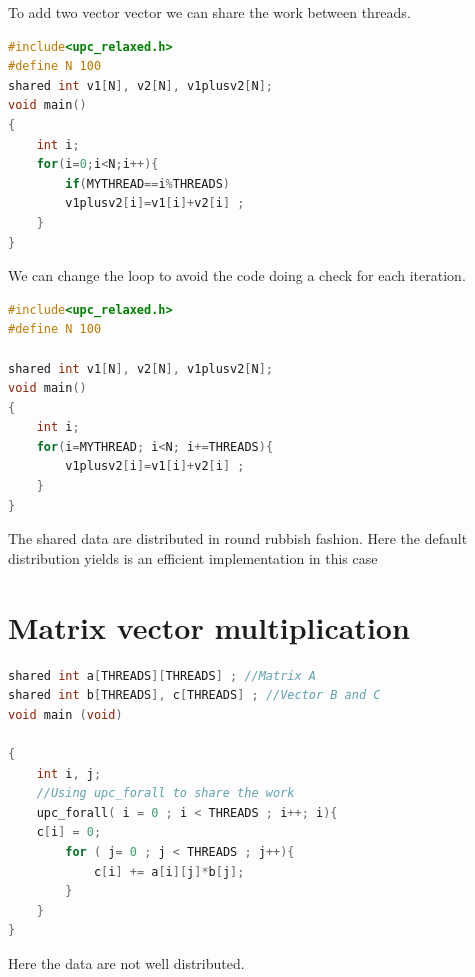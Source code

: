 \documentclass{report}
\begin{document}
To add two vector vector we can share the work between threads.

\begin{lstlisting}[language=C]
#include<upc_relaxed.h> 
#define N 100 
shared int v1[N], v2[N], v1plusv2[N]; 
void main() 
{ 
    int i; 
    for(i=0;i<N;i++){
        if(MYTHREAD==i%THREADS) 
        v1plusv2[i]=v1[i]+v2[i] ; 
    }
}
\end{lstlisting}

We can change the loop to avoid the code doing a check for each iteration.

\begin{lstlisting}[language=C]
#include<upc_relaxed.h> 
#define N 100 

shared int v1[N], v2[N], v1plusv2[N]; 
void main() 
{ 
    int i; 
    for(i=MYTHREAD; i<N; i+=THREADS){
        v1plusv2[i]=v1[i]+v2[i] ; 
    }
}
\end{lstlisting}

The shared data are distributed in round rubbish fashion. Here the default distribution yields is an efficient implementation in this case

\section{Matrix vector multiplication}

\begin{lstlisting}[language=C]
shared int a[THREADS][THREADS] ; //Matrix A
shared int b[THREADS], c[THREADS] ; //Vector B and C
void main (void) 

{
    int i, j; 
    //Using upc_forall to share the work
    upc_forall( i = 0 ; i < THREADS ; i++; i){
    c[i] = 0;
        for ( j= 0 ; j < THREADS ; j++){
            c[i] += a[i][j]*b[j];
        }
    }
}
\end{lstlisting}

Here the data are not well distributed.
\end{document}
